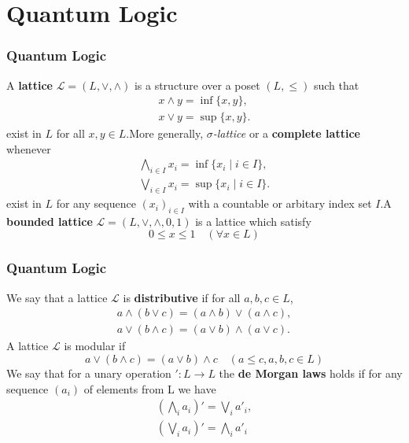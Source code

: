 \documentclass{beamer}
\begin{document}
\section{Quantum Logic}

\begin{frame}
    \frametitle{Quantum Logic}
    A \textbf{lattice} \(\mathcal{L}=(L,\vee,\wedge)\) is a structure over a poset \((L,\le)\) such that
    \begin{gather*}
        x\wedge y = \inf \{x,y\}, \\
        x \vee y = \sup \{x,y\}.
    \end{gather*}
    exist in \(L\) for all \(x,y \in L\).\pause More generally, \emph{\(\sigma\)-lattice} or a \textbf{complete lattice} whenever
    \begin{gather*}
        \bigwedge_{i\in I} x_i = \inf \{x_i \mid i \in I\}, \\
        \bigvee_{i\in I} x_i = \sup \{x_i \mid i \in I\}.
    \end{gather*}
    exist in \(L\) for any sequence \((x_i)_{i \in I}\) with a countable or arbitary index set \(I\).\pause A \textbf{bounded lattice} \(\mathcal{L}=(L,\vee,\wedge,0,1)\) is a lattice which satisfy
    \[ 0 \le x \le 1 \quad (\forall x \in L) \]
\end{frame}

\begin{frame}
    \frametitle{Quantum Logic}
We say that a lattice \(\mathcal{L}\) is \textbf{distributive} if for all \(a,b,c \in L\),
\begin{gather*}
    a\wedge(b\vee c) = (a\wedge b) \vee (a\wedge c),\\
    a \vee (b \wedge c) = (a \vee b) \wedge (a\vee c).
\end{gather*}\pause
A lattice \(\mathcal{L}\) is modular if
\[a \vee ( b \wedge c) = (a\vee b)\wedge c \quad (a\le c, a,b,c \in L)\]
We say that for a unary operation \(': L\to L\) the \textbf{de Morgan laws} holds if for any sequence \((a_i)\) of elements from L we have
\begin{gather*}
    (\bigwedge_i a_i)' = \bigvee_i a'_i, \\
    (\bigvee_i a_i)' = \bigwedge_i a'_i
\end{gather*}

\end{frame}
\end{document}
